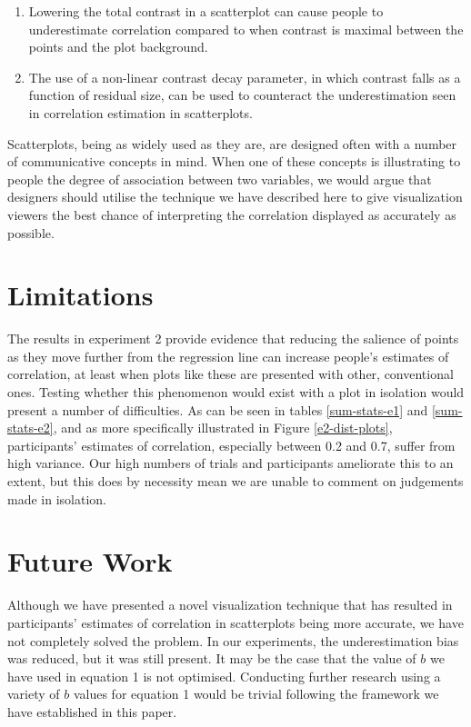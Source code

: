 \documentclass[preprint, 3p,
authoryear]{elsarticle} %
\begin{document}
\begin{enumerate}
\def\labelenumi{\arabic{enumi}.}
\item
  Lowering the total contrast in a scatterplot can cause people to
  underestimate correlation compared to when contrast is maximal between
  the points and the plot background.
\item
  The use of a non-linear contrast decay parameter, in which contrast
  falls as a function of residual size, can be used to counteract the
  underestimation seen in correlation estimation in scatterplots.
\end{enumerate}

Scatterplots, being as widely used as they are, are designed often with
a number of communicative concepts in mind. When one of these concepts
is illustrating to people the degree of association between two
variables, we would argue that designers should utilise the technique we
have described here to give visualization viewers the best chance of
interpreting the correlation displayed as accurately as possible.

\hypertarget{limitations}{%
\section{Limitations}\label{limitations}}

The results in experiment 2 provide evidence that reducing the salience
of points as they move further from the regression line can increase
people's estimates of correlation, at least when plots like these are
presented with other, conventional ones. Testing whether this phenomenon
would exist with a plot in isolation would present a number of
difficulties. As can be seen in tables \ref{sum-stats-e1} and
\ref{sum-stats-e2}, and as more specifically illustrated in Figure
\ref{e2-dist-plots}, participants' estimates of correlation, especially
between 0.2 and 0.7, suffer from high variance. Our high numbers of
trials and participants ameliorate this to an extent, but this does by
necessity mean we are unable to comment on judgements made in isolation.

\hypertarget{future-work}{%
\section{Future Work}\label{future-work}}

Although we have presented a novel visualization technique that has
resulted in participants' estimates of correlation in scatterplots being
more accurate, we have not completely solved the problem. In our
experiments, the underestimation bias was reduced, but it was still
present. It may be the case that the value of \(b\) we have used in
equation 1 is not optimised. Conducting further research using a variety
of \(b\) values for equation 1 would be trivial following the framework
we have established in this paper.
\end{document}
